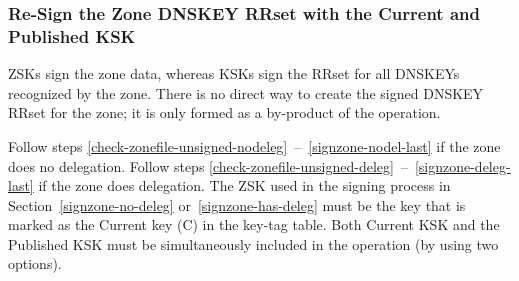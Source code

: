 
\subsubsection{Re-Sign the Zone DNSKEY RRset with the Current and Published KSK}

ZSKs sign the zone data, whereas KSKs sign the RRset for all DNSKEYs 
recognized by the zone. There is no direct way to create the signed DNSKEY
RRset for the zone; it is only formed as a by-product of the 
 operation.

Follow steps
\ref{check-zonefile-unsigned-nodeleg}~--~\ref{signzone-nodel-last}
if the zone does no delegation.  Follow steps
\ref{check-zonefile-unsigned-deleg}~--~\ref{signzone-deleg-last}
if the zone does delegation.  The ZSK used in the signing process in
Section~\ref{signzone-no-deleg} or~\ref{signzone-has-deleg} must be the key
that is marked as the Current key (C) in the key-tag table. Both Current KSK
and the Published KSK must be simultaneously included in the
 operation (by using two  options).


